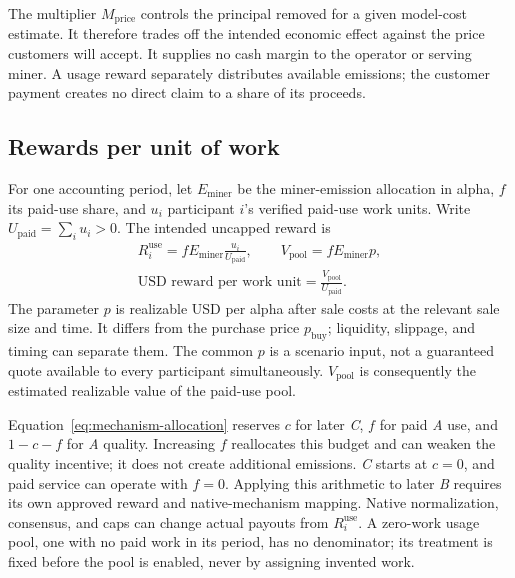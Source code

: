 The multiplier \(M_{\mathrm{price}}\) controls the principal removed for a given model-cost
estimate. It therefore trades off the intended economic effect against the
price customers will accept. It supplies no cash margin to the operator or
serving miner. A usage reward separately distributes available emissions;
the customer payment creates no direct claim to a share of its proceeds.

\subsection{Rewards per unit of work}

For one accounting period, let \(E_{\mathrm{miner}}\) be the miner-emission allocation in
alpha, \(f\) its paid-use share, and \(u_i\) participant \(i\)'s verified
paid-use work units. Write \(U_{\mathrm{paid}}=\sum_i u_i>0\). The intended uncapped reward is
\begin{equation}\label{eq:usage-economics}
\begin{gathered}
 R_i^{\mathrm{use}}=f E_{\mathrm{miner}}\frac{u_i}{U_{\mathrm{paid}}},\qquad
 V_{\mathrm{pool}}=f E_{\mathrm{miner}} p,\\
 \text{USD reward per work unit}=\frac{V_{\mathrm{pool}}}{U_{\mathrm{paid}}}.
\end{gathered}
\end{equation}
The parameter \(p\) is realizable USD per alpha after sale costs at the relevant
sale size and time. It differs from the purchase price
\(p_{\mathrm{buy}}\); liquidity, slippage, and timing can separate them.
The common \(p\) is a scenario input, not a guaranteed quote available to every
participant simultaneously. \(V_{\mathrm{pool}}\) is consequently the estimated realizable
value of the paid-use pool.

Equation~\ref{eq:mechanism-allocation} reserves \(c\) for later \textit{C},
\(f\) for paid \textit{A} use, and \(1-c-f\) for \textit{A} quality.
Increasing \(f\) reallocates this budget and can weaken the quality incentive;
it does not create additional emissions. \textit{C} starts at \(c=0\), and
paid service can operate with \(f=0\). Applying this arithmetic to later
\textit{B} requires its own approved reward and native-mechanism mapping.
Native normalization, consensus, and caps can change actual payouts from
\(R_i^{\mathrm{use}}\). A zero-work usage pool, one with no paid work in its
period, has no denominator; its treatment is fixed before the pool is enabled,
never by assigning invented work.

